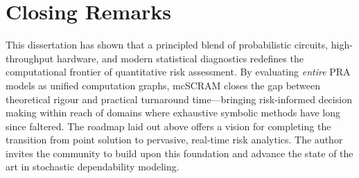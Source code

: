 \section*{Closing Remarks}

This dissertation has shown that a principled blend of probabilistic circuits,
high-throughput hardware, and modern statistical diagnostics redefines the
computational frontier of quantitative risk assessment.  By evaluating
\emph{entire} PRA models as unified computation graphs, mcSCRAM closes the gap
between theoretical rigour and practical turnaround time—bringing
risk-informed decision making within reach of domains where exhaustive symbolic
methods have long since faltered.  The roadmap laid out above offers a vision
for completing the transition from point solution to pervasive, real-time risk
analytics.  The author invites the community to build upon this foundation and
advance the state of the art in stochastic dependability modeling.

